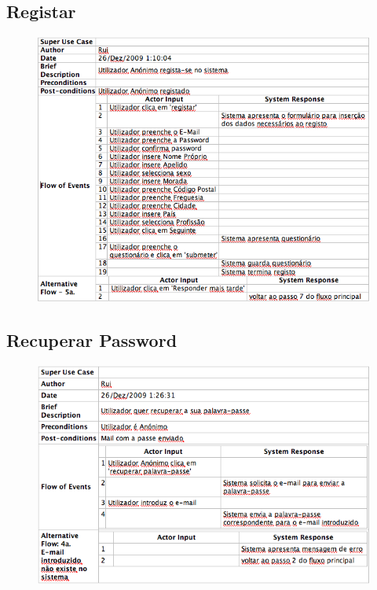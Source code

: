 \subsection{Registar}
\begin{figure}[!htb]
	\centering
	\includegraphics[scale=0.7]{images/Prints/RegistoUtilizadores/Registar.png}
\end{figure}

\pagebreak

\subsection{Recuperar Password}
\begin{figure}[!htb]
	\centering
	\includegraphics[scale=0.7]{images/Prints/RegistoUtilizadores/RecuperarPassword.png}
\end{figure}

